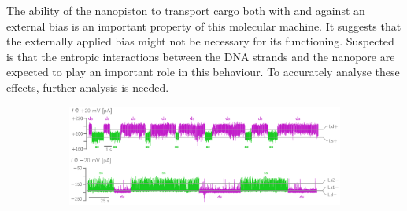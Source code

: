 The ability of the nanopiston to transport cargo both with and against an external bias
is an important property of this molecular machine. It suggests that the externally
applied bias might not be necessary for its functioning. Suspected is that the entropic
interactions between the DNA strands and the nanopore are expected to play an important
role in this behaviour. To accurately analyse these effects, further analysis is needed.
\begin{figure}[ht!]
  \begin{centering}
  \begin{subfigure}[t]{\dimexpr.95\linewidth-1.3em\relax}
  \centering
  \includegraphics[width=\linewidth,valign=t]{Figures/FluctuationRotaxane.png}
  \end{subfigure}%
  \vspace{0.6cm}
  \begin{subfigure}[t]{\dimexpr.5\linewidth-1.3em\relax}
  \centering

\end{subfigure}
\end{centering}
\end{figure}

